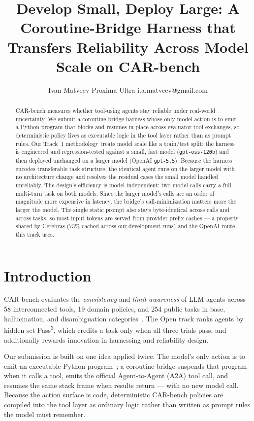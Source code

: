 \documentclass{article}
\title{Develop Small, Deploy Large: A Coroutine-Bridge Harness that\\
Transfers Reliability Across Model Scale on CAR-bench}
\author{
    Ivan Matveev
    \affiliations
    Proxima Ultra
    \emails
    i.a.matveev@gmail.com
}
\begin{document}
\maketitle

\begin{abstract}
CAR-bench measures whether tool-using agents stay reliable under real-world
uncertainty. We submit a coroutine-bridge harness whose only model action is to
emit a Python program that blocks and resumes in place across evaluator tool
exchanges, so deterministic policy lives as executable logic in the tool layer
rather than as prompt rules. Our Track~1 methodology treats model scale like a
train/test split: the harness is engineered and regression-tested against a
small, fast model (\texttt{gpt-oss-120b}) and then deployed unchanged on a
larger model (OpenAI \texttt{gpt-5.5}). Because the harness encodes transferable
task structure, the identical agent runs on the larger model with no
architecture change and resolves the residual cases the small model handled
unreliably. The design's efficiency is model-independent: two model calls carry
a full multi-turn task on both models. Since the larger model's calls are an
order of magnitude more expensive in latency, the bridge's call-minimization
matters more the larger the model. The single static prompt also stays
byte-identical across calls and across tasks, so most input tokens are served
from provider prefix caches --- a property shared by Cerebras (73\% cached
across our development runs) and the OpenAI route this track uses.
\end{abstract}

\section{Introduction}

CAR-bench evaluates the \emph{consistency} and \emph{limit-awareness} of LLM
agents across 58 interconnected tools, 19 domain policies, and 254 public tasks
in base, hallucination, and disambiguation categories~\cite{kirmayr2026carbench}.
The Open track ranks agents by hidden-set Pass\textsuperscript{3}, which credits
a task only when all three trials pass, and additionally rewards innovation in
harnessing and reliability design.

Our submission is built on one idea applied twice. The model's only action is to
emit an executable Python program~\cite{wang2024codeact}; a coroutine bridge
suspends that program when it calls a tool, emits the official Agent-to-Agent
(A2A) tool call, and resumes the same stack frame when results return --- with no
new model call. Because the action surface is code, deterministic CAR-bench
policies are compiled into the tool layer as ordinary logic rather than written
as prompt rules the model must remember.
\end{document}

